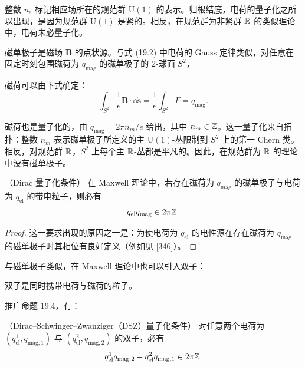 \begin{remark}[19.2]
整数 $n_e$ 标记相应场所在的规范群 $\mathrm{U}(1)$ 的表示。归根结底，电荷的量子化之所以出现，是因为规范群 $\mathrm{U}(1)$ 是紧的。相反，在规范群为非紧群 $\mathbb{R}$ 的类似理论中，电荷未必量子化。
\end{remark}

\begin{definition}[19.3]
磁单极子是磁场 $\mathbf{B}$ 的点状源。与式 (19.2) 中电荷的 Gauss 定律类似，对任意在固定时刻包围磁荷为 $q_{\mathrm{mag}}$ 的磁单极子的 2-球面 $S^2$，


磁荷可以由下式确定：
\begin{equation}
\int_{S^2}\frac{1}{e}\mathbf{B}\cdot \dd\mathbf{s}
=\frac{1}{e}\int_{S^2}F=q_{\mathrm{mag}} . \tag{19.3}
\end{equation}
\end{definition}

磁荷也是量子化的，由 $q_{\mathrm{mag}}=2\pi n_m/e$ 给出，其中 $n_m\in\mathbb{Z}$。这一量子化来自拓扑：整数 $n_m$ 表示磁单极子所定义的主 $\mathrm{U}(1)$-丛限制到 $S^2$ 上的第一 Chern 类。相反，对规范群 $\mathbb{R}$，$S^2$ 上每个主 $\mathbb{R}$-丛都是平凡的。因此，在规范群为 $\mathbb{R}$ 的理论中没有磁单极子。

\begin{proposition}[19.4]（Dirac 量子化条件）
在 Maxwell 理论中，若存在磁荷为 $q_{\mathrm{mag}}$ 的磁单极子与电荷为 $q_{\mathrm{el}}$ 的带电粒子，则必有
\[
q_{\mathrm{el}}q_{\mathrm{mag}}\in 2\pi\mathbb{Z} .
\]
\end{proposition}

\begin{proof}
这一要求出现的原因之一是：为使电荷为 $q_{\mathrm{el}}$ 的电性源在存在磁荷为 $q_{\mathrm{mag}}$ 的磁单极子时其相位有良好定义（例如见 [346]）。
\end{proof}

与磁单极子类似，在 Maxwell 理论中也可以引入双子：

\begin{definition}[19.5]
双子是同时携带电荷与磁荷的粒子。
\end{definition}

推广命题 19.4，有：

\begin{proposition}[19.6]（Dirac--Schwinger--Zwanziger（DSZ）量子化条件）
对任意两个电荷为 $(q_{\mathrm{el}}^1,q_{\mathrm{mag},1})$ 与 $(q_{\mathrm{el}}^2,q_{\mathrm{mag},2})$ 的双子，必有
\[
q_{\mathrm{el}}^1q_{\mathrm{mag},2}-q_{\mathrm{el}}^2q_{\mathrm{mag},1}\in 2\pi\mathbb{Z} .
\]
\end{proposition}

